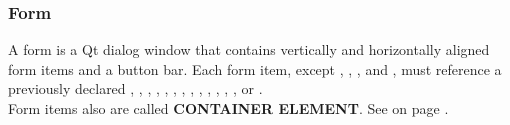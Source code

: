 \subsubsection{Form}
\label{sec:uiform}
A form is a Qt dialog window
that contains vertically and horizontally aligned form items
and a button bar. Each form item, except
  \STDWINDOW, \LOGWINDOW, \SEPARATOR, \VOID{} and \STRETCH,
must reference a previously declared
  \FOLDER, \FIELDGROUP
, \PLUGIN, \UNIPLOT, \LISTPLOT, \PLOTTHREED, \IMAGE
, \LIST, \LINEPLOT, \PLOTTWOD, \TEXTWINDOW, \NAVIGATOR
, \THERMO, \TIMETABLE{} or \TABLE{}. \\

\vspace{1cm}
Form items also are called {\bfseries CONTAINER ELEMENT}.
See  on page \pageref{dia:uiformcontainerelement}. \\



\label{uimanagerformhorizontallist}






